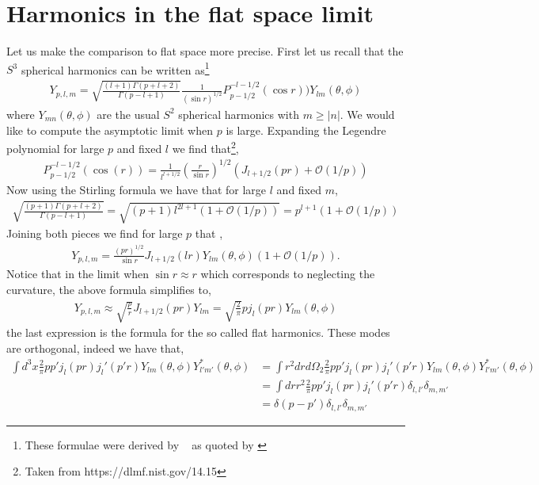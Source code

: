 \documentclass[a4paper,11pt]{article}
\numberwithin{equation}{section}
\numberwithin{equation}{section}
\begin{document}
\section{Harmonics in the   flat space limit}
\label{sec:Harmonics}
Let us make the comparison to flat space more precise. First let us recall that the $S^3$ spherical harmonics can be written as\footnote{These formulae were derived by ~\cite{Lifshitz:1963ps,Harrison:1967zza} as quoted by \cite{Ratra:2017ezv}}
\begin{align}
Y_{p,l,m}=\sqrt{\frac{(l+1)\Gamma(p+l+2)}{\Gamma(p-l+1)}}\frac{1}{(\sin r)^{1/2}}P^{-l-1/2}_{p-1/2}(\cos r))Y_{lm}(\theta,\phi)
\end{align} where $Y_{mn}(\theta,\phi)$ are the usual $S^2$ spherical harmonics with $m\geq \vert n\vert$.
We would like to compute the asymptotic limit when $p$ is large. Expanding the Legendre polynomial for large $p$  and fixed $l$ we find that\footnote{Taken from https://dlmf.nist.gov/14.15},
\begin{align}
P^{-l-1/2}_{p-1/2}(\cos(r))=\frac{1}{l^{l+1/2}}\left(\frac{r}{\sin r}\right)^{1/2}(J_{l+1/2}(p r)+\mathcal{O}(1/p))
\end{align}
Now using the Stirling formula we have that for  large $l$  and fixed $m$,
\begin{align}
\sqrt{\frac{(p+1)\Gamma(p+l+2)}{\Gamma(p-l+1)}}=\sqrt{(p+1)l^{2l+1}(1+\mathcal{O}(1/p))}=p^{l+1}(1+\mathcal{O}(1/p))
\end{align}
Joining both pieces we find for large $p$ that ,
\begin{align}
Y_{p,l,m}=\frac{(pr)^{1/2}}{\sin r}J_{l+1/2}(l r)Y_{lm}(\theta,\phi)(1+\mathcal{O}(1/p)).
\end{align}
Notice that in the limit when $\sin r\approx r$ which corresponds to neglecting the curvature, the above formula simplifies to,
\begin{align}
Y_{p,l,m}\approx\sqrt{\frac{p}{r}}J_{l+1/2}(p r)Y_{lm}=\sqrt{\frac{2}{\pi}}p j_l(pr)Y_{lm}(\theta,\phi)
\end{align}
the last expression is the formula for the so called flat harmonics. These modes are orthogonal, indeed we have that,
\begin{align}
\int d^3 x \frac{2}{\pi} p p' j_l(p r)j_l' (p'r)Y_{lm}(\theta,\phi)Y^*_{l'm'}(\theta,\phi)&=\int r^2 dr d\Omega_2 \frac{2}{\pi} p p' j_l(p r)j_l' (p'r)Y_{lm}(\theta,\phi)Y^*_{l'm'}(\theta,\phi)\nonumber\\
&=\int dr r^2\frac{2}{\pi} pp'j_l(pr)j_l'(p'r)\delta_{l,l'}\delta_{m,m'}\nonumber\\
&=\delta(p-p')\delta_{l,l'}\delta_{m,m'}
\end{align} 
\end{document}
